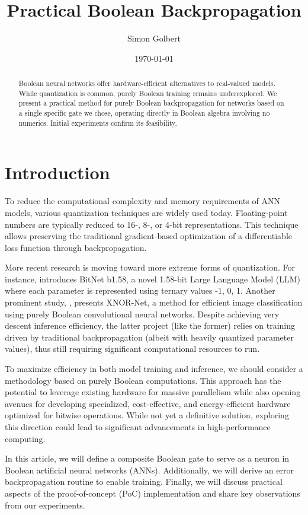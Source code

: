 \documentclass{article}
\title{Practical Boolean Backpropagation}
\author{Simon Golbert}
\date{\today}
\begin{document}
\maketitle

\begin{abstract}
    Boolean neural networks offer hardware-efficient alternatives to real-valued models. While quantization is common, purely Boolean training remains underexplored. We present a practical method for purely Boolean backpropagation for networks based on a single specific gate we chose, operating directly in Boolean algebra involving no numerics. Initial experiments confirm its feasibility.
\end{abstract}

\section{Introduction}
    To reduce the computational complexity and memory requirements of ANN models, various quantization techniques are widely used today. Floating-point numbers are typically reduced to 16-, 8-, or 4-bit representations. This technique allows preserving the traditional gradient-based optimization of a differentiable loss function through backpropagation.
    
    More recent research is moving toward more extreme forms of quantization. For instance, \cite{ma2024} introduces BitNet b1.58, a novel 1.58-bit Large Language Model (LLM) where each parameter is represented using ternary values {-1, 0, 1}. Another prominent study, \cite{rastegari2016}, presents XNOR-Net, a method for efficient image classification using purely Boolean convolutional neural networks. Despite achieving very descent inference efficiency, the latter project (like the former) relies on training driven by traditional backpropagation (albeit with heavily quantized parameter values), thus still requiring significant computational resources to run.

    To maximize efficiency in both model training and inference, we should consider a methodology based on purely Boolean computations. This approach has the potential to leverage existing hardware for massive parallelism while also opening avenues for developing specialized, cost-effective, and energy-efficient hardware optimized for bitwise operations. While not yet a definitive solution, exploring this direction could lead to significant advancements in high-performance computing.

    In this article, we will define a composite Boolean gate to serve as a neuron in Boolean artificial neural networks (ANNs). Additionally, we will derive an error backpropagation routine to enable training. Finally, we will discuss practical aspects of the proof-of-concept (PoC) implementation and share key observations from our experiments.
\end{document}
